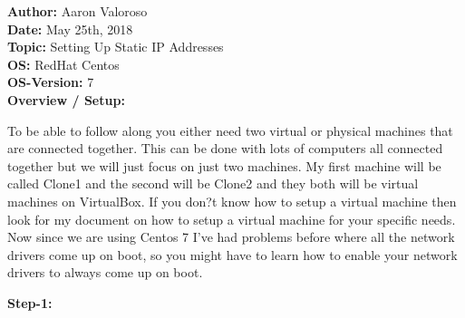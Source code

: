 \documentclass[11pt, a4papper]{article}
\begin{document}
\noindent\textbf{Author: } Aaron Valoroso \\
\textbf{Date: } May 25th, 2018 \\
\textbf{Topic: } Setting Up Static IP Addresses \\
\textbf{OS: } RedHat Centos \\
\textbf{OS-Version: } 7 \\[1cm]

\textbf{Overview / Setup: } \\
\begin{adjustwidth}{3cm}{} 
To be able to follow along you either need two virtual or physical machines that are connected together. This can be done with lots of computers all connected together but we will just focus on just two machines. My first machine will be called Clone1 and the second will be Clone2 and they both will be virtual machines on VirtualBox. If you don?t know how to setup a virtual machine then look for my document on how to setup a virtual machine for your specific needs. Now since we are using Centos 7 I've had problems before where all the network drivers come up on boot, so you might have to learn how to enable your network drivers to always come up on boot. \\
\end{adjustwidth}
\indent \indent \textbf{Step-1: } \\
\end{document}
